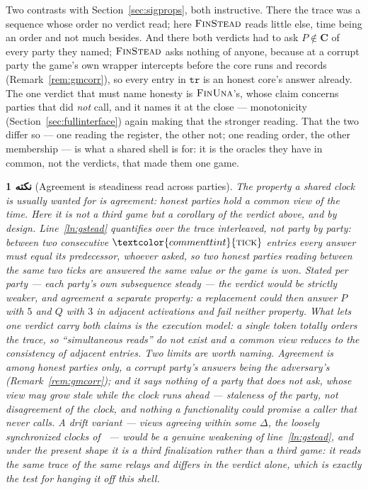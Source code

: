 \documentclass[10pt,oneside,openany]{book}
\newcommand{\Cs}{\mathbf{C}}
\newcommand{\op}[1]{\textnormal{\textsc{#1}}}
\newcommand{\atom}[1]{\textcolor{commenttint}{\op{#1}}}
\newcommand{\V}[1]{\mathtt{#1}}
\theoremstyle{accentdef}
\newtheorem{remark}[definition]{نکته}
\theoremstyle{accentplain}
\begin{document}
Two contrasts with Section~\ref{sec:sigprops}, both instructive. There the trace was a sequence
whose order no verdict read; here $\op{FinStead}$ reads little else, time being an order and
not much besides. And there both verdicts had to ask $P \notin \Cs$ of every party they named;
$\op{FinStead}$ asks nothing of anyone, because at a corrupt party the game's own wrapper
intercepts before the core runs and records (Remark~\ref{rem:gmcorr}), so every entry in $\V{tr}$
is an honest core's answer already. The one verdict that must name honesty is $\op{FinUna}$'s,
whose claim concerns parties that did \emph{not} call, and it names it at the close ---
monotonicity (Section~\ref{sec:fullinterface}) again making that the stronger reading. That the
two differ so --- one reading the register, the other not; one reading order, the other
membership --- is what a shared shell is for: it is the oracles they have in common, not the
verdicts, that made them one game.

\begin{remark}[Agreement is steadiness read across parties]\label{rem:clockagree}
The property a shared clock is usually wanted for is \emph{agreement}: honest parties hold a
common view of the time. Here it is not a third game but a corollary of the verdict above, and by
design. Line~\ref{ln:gstead} quantifies over the trace \emph{interleaved}, not party by party:
between two consecutive $\atom{tick}$ entries every answer must equal its predecessor, whoever
asked, so two honest parties reading between the same two ticks are answered the same value or
the game is won. Stated per party --- each party's own subsequence steady --- the verdict would
be strictly weaker, and agreement a separate property: a replacement could then answer $P$ with
$5$ and $Q$ with $3$ in adjacent activations and fail neither property. What lets one verdict carry
both claims is the execution model: a single token totally orders the trace, so ``simultaneous
reads'' do not exist and a common view reduces to the consistency of adjacent entries. Two limits
are worth naming. Agreement is among honest parties only, a corrupt party's answers being the
adversary's (Remark~\ref{rem:gmcorr}); and it says nothing of a party that does not ask, whose
view may grow stale while the clock runs ahead --- staleness of the party, not disagreement of
the clock, and nothing a functionality could promise a caller that never calls. A \emph{drift}
variant --- views agreeing within some $\Delta$, the loosely synchronized clocks
of~\cite{KMTZ13} --- would be a genuine weakening of line~\ref{ln:gstead}, and under the present
shape it is a third finalization rather than a third game: it reads the same trace of the same
relays and differs in the verdict alone, which is exactly the test for hanging it off this shell.
\end{remark}
\end{document}

